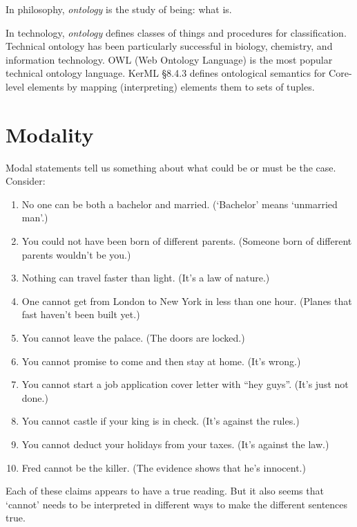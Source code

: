 \pn In philosophy, \emph{ontology} is the study of being:  what is.

\pn In technology, \emph{ontology} defines classes of things and procedures for classification.
Technical ontology has been particularly successful in biology, chemistry, and information technology.
OWL (Web Ontology Language) \cite{OWL} is the most popular technical ontology language.
KerML \S 8.4.3 defines ontological semantics for Core-level elements by mapping (interpreting) elements them to sets of tuples.

\section{Modality}\label{sec:modality}


\pn Modal statements tell us something about what could be or must be the case.\cite{modality-varieties}
Consider:
\begin{enumerate}
\item No one can be both a bachelor and married. (‘Bachelor’ means ‘unmarried man’.)
\item You could not have been born of different parents. (Someone born of different parents wouldn’t be you.)
\item Nothing can travel faster than light. (It’s a law of nature.)
\item One cannot get from London to New York in less than one hour. (Planes that fast haven’t been built yet.)
\item You cannot leave the palace. (The doors are locked.)
\item You cannot promise to come and then stay at home. (It’s wrong.)
\item You cannot start a job application cover letter with “hey guys”. (It’s just not done.)
\item You cannot castle if your king is in check. (It’s against the rules.)
\item You cannot deduct your holidays from your taxes. (It’s against the law.)
\item Fred cannot be the killer. (The evidence shows that he’s innocent.)
\end{enumerate}

\pn Each of these claims appears to have a true reading. But it also seems that ‘cannot’ needs to be interpreted in different ways to make the different sentences true.

